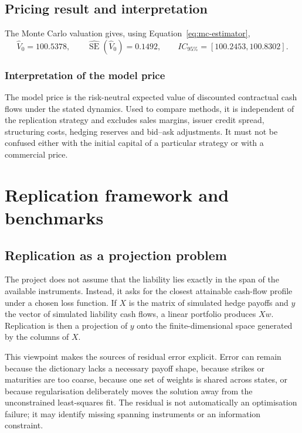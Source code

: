 \documentclass[12pt,a4paper]{article}
\newcommand{\1}{\mathbf{1}}
\begin{document}
\subsection{Pricing result and interpretation}

The Monte Carlo valuation gives, using Equation~\eqref{eq:mc-estimator},
\begin{equation}
 \widehat V_0=100.5378,\qquad
 \widehat{\operatorname{SE}}(\widehat V_0)=0.1492,
 \qquad IC_{95\%}=[100.2453,100.8302].
\label{eq:model-price}
\end{equation}

\subsubsection*{Interpretation of the model price}

The model price is the risk-neutral expected value of discounted contractual
cash flows under the stated dynamics. Used to compare methods, it is independent
of the replication strategy and excludes sales margins, issuer credit spread,
structuring costs, hedging reserves and bid--ask adjustments. It must not be
confused either with the initial capital of a particular strategy or with a
commercial price.

\section{Replication framework and benchmarks}

\subsection{Replication as a projection problem}

The project does not assume that the liability lies exactly in the span of the
available instruments. Instead, it asks for the closest attainable cash-flow
profile under a chosen loss function. If $X$ is the matrix of simulated hedge
payoffs and $y$ the vector of simulated liability cash flows, a linear
portfolio produces $Xw$. Replication is then a projection of $y$ onto the
finite-dimensional space generated by the columns of $X$.

This viewpoint makes the sources of residual error explicit. Error can remain
because the dictionary lacks a necessary payoff shape, because strikes or
maturities are too coarse, because one set of weights is shared across states,
or because regularisation deliberately moves the solution away from the
unconstrained least-squares fit. The residual is not automatically an
optimisation failure; it may identify missing spanning instruments or an
information constraint.
\end{document}

